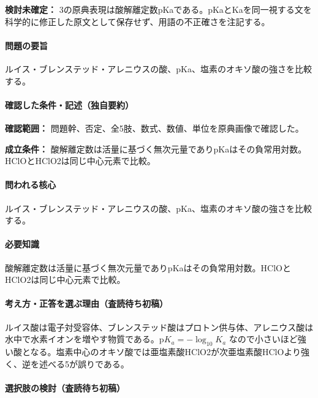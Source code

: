 \par\textbf{検討未確定：} 3の原典表現は酸解離定数pKaである。pKaとKaを同一視する文を科学的に修正した原文として保存せず、用語の不正確さを注記する。

\paragraph{問題の要旨} ルイス・ブレンステッド・アレニウスの酸、pKa、塩素のオキソ酸の強さを比較する。

\paragraph{確認した条件・記述（独自要約）}\mbox{}\par

\noindent\textbf{確認範囲：} 問題幹、否定、全5肢、数式、数値、単位を原典画像で確認した。\par

\noindent\textbf{成立条件：} 酸解離定数は活量に基づく無次元量でありpKaはその負常用対数。HClOとHClO2は同じ中心元素で比較。\par

\paragraph{問われる核心} ルイス・ブレンステッド・アレニウスの酸、pKa、塩素のオキソ酸の強さを比較する。

\paragraph{必要知識} 酸解離定数は活量に基づく無次元量でありpKaはその負常用対数。HClOとHClO2は同じ中心元素で比較。

\paragraph{考え方・正答を選ぶ理由（査読待ち初稿）} ルイス酸は電子対受容体、ブレンステッド酸はプロトン供与体、アレニウス酸は水中で水素イオンを増やす物質である。\(\mathrm{p}K_a=-\log_{10}K_a\) なので小さいほど強い酸となる。塩素中心のオキソ酸では亜塩素酸HClO2が次亜塩素酸HClOより強く、逆を述べる5が誤りである。

\paragraph{選択肢の検討（査読待ち初稿）}\mbox{}\par


